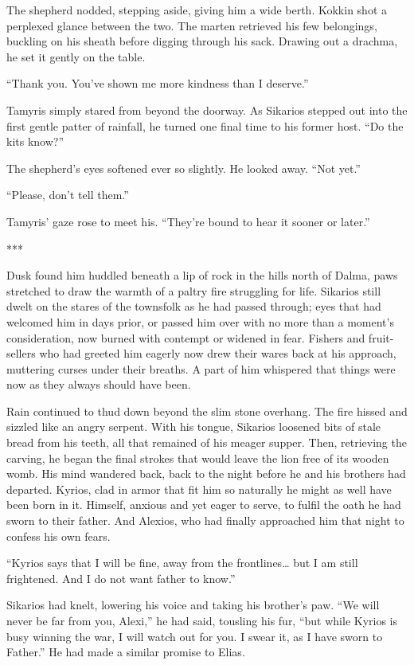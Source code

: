 The shepherd nodded, stepping aside, giving him a wide berth. Kokkin shot a perplexed glance between the two. The marten retrieved his few belongings, buckling on his sheath before digging through his sack. Drawing out a drachma, he set it gently on the table.

``Thank you. You've shown me more kindness than I deserve.''

Tamyris simply stared from beyond the doorway. As Sikarios stepped out into the first gentle patter of rainfall, he turned one final time to his former host. ``Do the kits know?''

The shepherd's eyes softened ever so slightly. He looked away. ``Not yet.''

``Please, don't tell them.''

Tamyris' gaze rose to meet his. ``They're bound to hear it sooner or later.''

***

Dusk found him huddled beneath a lip of rock in the hills north of Dalma, paws stretched to draw the warmth of a paltry fire struggling for life. Sikarios still dwelt on the stares of the townsfolk as he had passed through; eyes that had welcomed him in days prior, or passed him over with no more than a moment's consideration, now burned with contempt or widened in fear. Fishers and fruit-sellers who had greeted him eagerly now drew their wares back at his approach, muttering curses under their breaths. A part of him whispered that things were now as they always should have been.

Rain continued to thud down beyond the slim stone overhang. The fire hissed and sizzled like an angry serpent. With his tongue, Sikarios loosened bits of stale bread from his teeth, all that remained of his meager supper. Then, retrieving the carving, he began the final strokes that would leave the lion free of its wooden womb. His mind wandered back, back to the night before he and his brothers had departed. Kyrios, clad in armor that fit him so naturally he might as well have been born in it. Himself, anxious and yet eager to serve, to fulfil the oath he had sworn to their father. And Alexios, who had finally approached him that night to confess his own fears.

``Kyrios says that I will be fine, away from the frontlines\ldots{} but I am still frightened. And I do not want father to know.''

Sikarios had knelt, lowering his voice and taking his brother's paw. ``We will never be far from you, Alexi,'' he had said, tousling his fur, ``but while Kyrios is busy winning the war, I will watch out for you. I swear it, as I have sworn to Father.'' He had made a similar promise to Elias.

